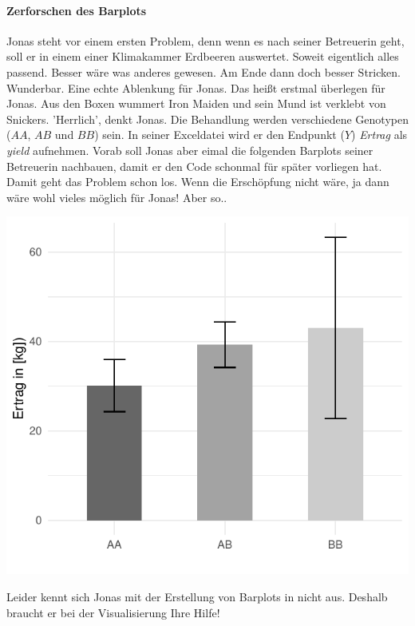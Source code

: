 \documentclass[a4paper, 9pt]{scrartcl}\usepackage[]{graphicx}\usepackage[]{xcolor}
\makeatletter
\def\maxwidth{ %
  \ifdim\Gin@nat@width>\linewidth
    \linewidth
  \else
    \Gin@nat@width
  \fi
}
\makeatother
\begin{document}
\paragraph{Zerforschen des Barplots}

Jonas steht vor einem ersten Problem, denn wenn es nach seiner Betreuerin geht, soll er in einem einer Klimakammer Erdbeeren auswertet. Soweit eigentlich alles passend. Besser wäre was anderes gewesen. Am Ende dann doch besser Stricken. Wunderbar. Eine echte Ablenkung für Jonas. Das heißt erstmal überlegen für Jonas. Aus den Boxen wummert Iron Maiden und sein Mund ist verklebt von Snickers. 'Herrlich', denkt Jonas. Die Behandlung werden verschiedene Genotypen ($AA$, $AB$ und $BB$) sein. In seiner Exceldatei wird er den Endpunkt ($Y$) \textit{Ertrag} als \textit{yield} aufnehmen. Vorab soll Jonas aber eimal die folgenden Barplots seiner Betreuerin nachbauen, damit er den \Rlogo Code schonmal für später vorliegen hat. Damit geht das Problem schon los. Wenn die Erschöpfung nicht wäre, ja dann wäre wohl vieles möglich für Jonas! Aber so..



{\centering \includegraphics[width=\maxwidth]{img/barplot-02-1} 

}




Leider kennt sich Jonas mit der Erstellung von Barplots in \Rlogo nicht aus. Deshalb braucht er bei der Visualisierung Ihre Hilfe!
\end{document}
